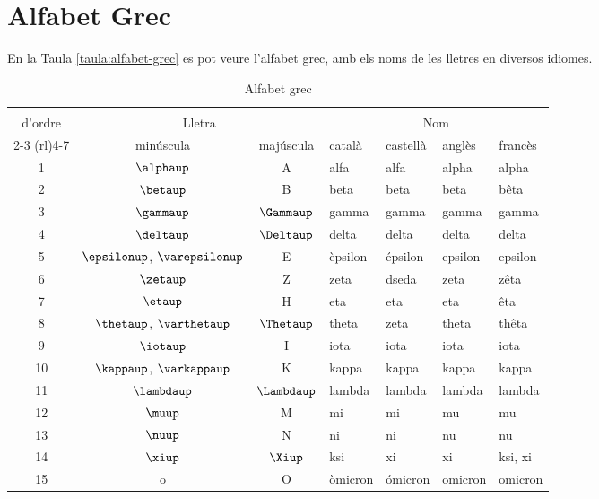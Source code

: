 \chapter{Alfabet Grec} 

 En la Taula \vref{taula:alfabet-grec} es pot veure l'alfabet grec,
 amb els noms de les lletres en diversos idiomes.

\begin{table}[h]
   \caption{\label{taula:alfabet-grec} Alfabet grec}
   \begin{center}\begin{tabular}{cccllll}
   \toprule[1pt]
   \renewcommand*{\multirowsetup}{\centering}
   \multirow{2}{15mm}{\rule{0mm}{4.5mm}N\'{u}mero\\d'ordre} & \multicolumn{2}{c}{Lletra} &
   \multicolumn{4}{c}{Nom} \\
   \cmidrule(rl){2-3} \cmidrule(rl){4-7}
    & min\'{u}scula & maj\'{u}scula & catal\`{a} & castell\`{a} &  angl\`{e}s & franc\`{e}s\\
   \midrule
   1  & $\alphaup$ & A & alfa & alfa &  alpha & alpha\\
   2  & $\betaup$ & B & beta & beta &  beta & b\^{e}ta\\
   3  & $\gammaup$ & $\Gammaup$ & gamma & gamma &  gamma & gamma\\
   4  & $\deltaup$ & $\Deltaup$ & delta & delta &  delta & delta\\
   5  & $\epsilonup$, $\varepsilonup$ & E & \`{e}psilon & \'{e}psilon &  epsilon & epsilon\\
   6  & $\zetaup$ & Z & zeta & dseda &  zeta & z\^{e}ta\\
   7  & $\etaup$ & H & eta & eta &  eta & \^{e}ta\\
   8  & $\thetaup$, $\varthetaup$ & $\Thetaup$ & theta & zeta &  theta & th\^{e}ta\\
   9  & $\iotaup$ & I & iota & iota &  iota & iota\\
   10 & $\kappaup$, $\varkappaup$ & K & kappa & kappa &  kappa & kappa\\
   11 & $\lambdaup$ & $\Lambdaup$ & lambda & lambda &  lambda &lambda\\
   12 & $\muup$ & M & mi & mi &  mu & mu\\
   13 & $\nuup$ & N & ni & ni &  nu & nu\\
   14 & $\xiup$ & $\Xiup$ & ksi & xi &  xi & ksi, xi\\
   15 & o & O & \`{o}micron & \'{o}micron &  omicron & omicron\\

\end{tabular}
\end{center}
\end{table}
